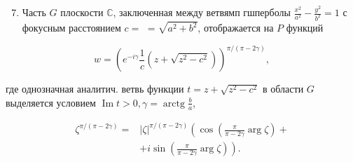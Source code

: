 \documentclass[10pt]{article}
\begin{document}
\begin{enumerate}

  \setcounter{enumi}{6}

  \item Часть $G$ плоскости $\mathbb{C}$, заключенная между ветвямп гшперболы $\frac{x^{2}}{a^{2}}-\frac{y^{2}}{b^{2}}=1$ с фокусным расстоянием $c=$ $=\sqrt{a^{2}+b^{2}}$, отображается на $P$ функций

\end{enumerate}



\[

w=\left(e^{-i \gamma} \frac{1}{c}\left(z+\sqrt{z^{2}-c^{2}}\right)\right)^{\pi /(\pi-2 \gamma)},

\]



где однозначная аналитич. ветвь функции $t=z+\sqrt{z^{2}-c^{2}}$ в области $G$ выделяется условием $\operatorname{Im} t>0, \gamma=\operatorname{arctg} \frac{b}{a}$,



\[

\begin{aligned}

\zeta^{\pi /(\pi-2 \gamma)}= & |\zeta|^{\pi /(\pi-2 \gamma)}\left(\cos \left(\frac{\pi}{\pi-2 \gamma} \arg \zeta\right)+\right. \\

& \left.+i \sin \left(\frac{\pi}{\pi-2 \gamma} \arg \zeta\right)\right) .

\end{aligned}

\]
\end{document}
